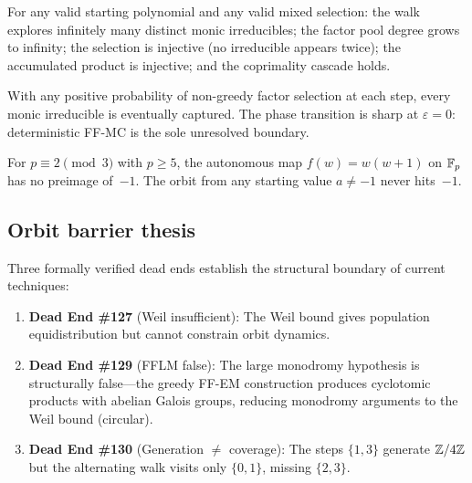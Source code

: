 \begin{theorem}\label{thm:main-tree}
For any valid starting polynomial and any valid mixed selection:
the walk explores infinitely many distinct monic irreducibles;
the factor pool degree grows to infinity;
the selection is injective (no irreducible appears twice);
the accumulated product is injective;
and the coprimality cascade holds.
\end{theorem}

\begin{theorem}\label{thm:main-stochastic}
With any positive probability of non-greedy factor selection at each step,
every monic irreducible is eventually captured. The phase transition is
sharp at $\varepsilon = 0$: deterministic FF-MC is the sole unresolved
boundary.
\end{theorem}

\begin{theorem}\label{thm:main-phi3}
For $p \equiv 2 \pmod{3}$ with $p \geq 5$, the autonomous map
$f(w) = w(w+1)$ on $\mathbb{F}_p$ has no preimage of~$-1$. The orbit from any
starting value $a \neq -1$ never hits~$-1$.
\end{theorem}

\subsection{Orbit barrier thesis}

Three formally verified dead ends establish the structural boundary of
current techniques:

\begin{enumerate}[label=(\roman*)]
  \item \textbf{Dead End \#127} (Weil insufficient):
    The Weil bound gives population equidistribution but cannot constrain
    orbit dynamics. 
  \item \textbf{Dead End \#129} (FFLM false):
    The large monodromy hypothesis is structurally false---the greedy
    FF-EM construction produces cyclotomic products with abelian Galois
    groups, reducing monodromy arguments to the Weil bound (circular).
  \item \textbf{Dead End \#130} (Generation $\neq$ coverage):
    The steps $\{1,3\}$ generate $\mathbb{Z}/4\mathbb{Z}$ but the alternating walk
    visits only $\{0,1\}$, missing $\{2,3\}$.
\end{enumerate}

